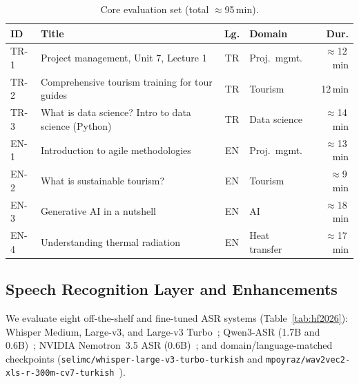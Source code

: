 \documentclass[conference]{IEEEtran}
\begin{document}
\begin{table}[t]
\caption{Core evaluation set (total $\approx$95\,min).}
\label{tab:data}
\centering
\renewcommand{\arraystretch}{1.12}
\setlength{\tabcolsep}{3.5pt}
\begin{tabular}{@{}l p{3.25cm} c p{1.25cm} r@{}}
\toprule
\textbf{ID} & \textbf{Title} & \textbf{Lg.} & \textbf{Domain} & \textbf{Dur.} \\
\midrule
TR-1 & Project management, Unit 7, Lecture 1 & TR & Proj.\ mgmt. & $\approx$12\,min \\
TR-2 & Comprehensive tourism training for tour guides & TR & Tourism & 12\,min \\
TR-3 & What is data science? Intro to data science (Python) & TR & Data science & $\approx$14\,min \\
EN-1 & Introduction to agile methodologies & EN & Proj.\ mgmt. & $\approx$13\,min \\
EN-2 & What is sustainable tourism? & EN & Tourism & $\approx$9\,min \\
EN-3 & Generative AI in a nutshell & EN & AI & $\approx$18\,min \\
EN-4 & Understanding thermal radiation & EN & Heat transfer & $\approx$17\,min \\
\bottomrule
\end{tabular}
\end{table}

\subsection{Speech Recognition Layer and Enhancements}

We evaluate eight off-the-shelf and fine-tuned ASR systems (Table~\ref{tab:hf2026}): Whisper Medium, Large-v3, and Large-v3 Turbo~\cite{radford2023,whisper-turbo}; Qwen3-ASR (1.7B and 0.6B)~\cite{qwen3asr2026}; NVIDIA Nemotron~3.5 ASR (0.6B)~\cite{nemotron35asr2026}; and domain/language-matched checkpoints (\texttt{selimc/whisper-large-v3-turbo-turkish} and \texttt{mpoyraz/wav2vec2-xls-r-300m-cv7-turkish}~\cite{mercan2023}).
\end{document}
